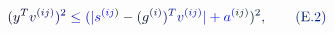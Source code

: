\documentclass[12pt]{article}
\begin{document}
\makeatletter
\renewcommand*{\@textcolor}[3]{%
  \protect\leavevmode
  \begingroup
    \color#1{#2}#3%
  \endgroup
}
\makeatother
\begin{displaymath}
\mathcolor[RGB]{0,0,15}{(} \mathcolor[RGB]{0,0,30}{y} ^ { \mathcolor[RGB]{0,0,45}{T} } \mathcolor[RGB]{0,0,60}{v} ^ { \mathcolor[RGB]{0,0,75}{(} \mathcolor[RGB]{0,0,90}{i} \mathcolor[RGB]{0,0,105}{j} \mathcolor[RGB]{0,0,120}{)} } \mathcolor[RGB]{0,0,135}{)} ^ { \mathcolor[RGB]{0,0,150}{2} } \mathcolor[RGB]{0,0,165}{\leq} \mathcolor[RGB]{0,0,180}{(} \mathcolor[RGB]{0,0,195}{|} \mathcolor[RGB]{0,0,210}{s} ^ { \mathcolor[RGB]{0,0,225}{(} \mathcolor[RGB]{0,0,240}{i} \mathcolor[RGB]{0,0,255}{j} \mathcolor[RGB]{0,15,0}{)} } \mathcolor[RGB]{0,15,15}{-} \mathcolor[RGB]{0,15,30}{(} \mathcolor[RGB]{0,15,45}{g} ^ { \mathcolor[RGB]{0,15,60}{(} \mathcolor[RGB]{0,15,75}{i} \mathcolor[RGB]{0,15,90}{)} } \mathcolor[RGB]{0,15,105}{)} ^ { \mathcolor[RGB]{0,15,120}{T} } \mathcolor[RGB]{0,15,135}{v} ^ { \mathcolor[RGB]{0,15,150}{(} \mathcolor[RGB]{0,15,165}{i} \mathcolor[RGB]{0,15,180}{j} \mathcolor[RGB]{0,15,195}{)} } \mathcolor[RGB]{0,15,210}{|} \mathcolor[RGB]{0,15,225}{+} \mathcolor[RGB]{0,15,240}{a} ^ { \mathcolor[RGB]{0,15,255}{(} \mathcolor[RGB]{0,30,0}{i} \mathcolor[RGB]{0,30,15}{j} \mathcolor[RGB]{0,30,30}{)} } \mathcolor[RGB]{0,30,45}{)} ^ { \mathcolor[RGB]{0,30,60}{2} } \mathcolor[RGB]{0,30,75}{,} \qquad \mathcolor[RGB]{0,30,90}{(} \mathrm { \mathcolor[RGB]{0,30,105}{E} \mathcolor[RGB]{0,30,120}{.} \mathcolor[RGB]{0,30,135}{2} } \mathcolor[RGB]{0,30,150}{)}
\end{displaymath}
\end{document}
